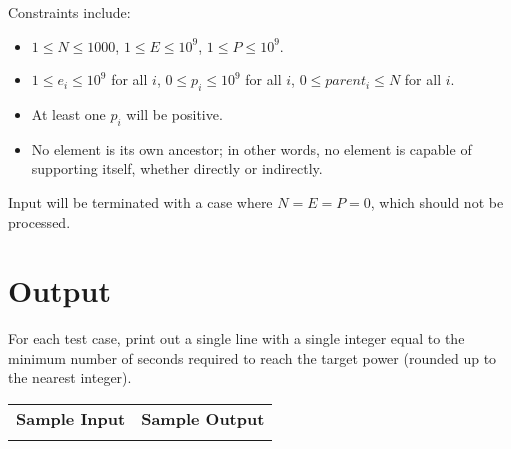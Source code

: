 \documentclass{article}
\begin{document}
Constraints include:
\begin{itemize}
\item $1 \le N \le 1000$, $1 \le E \le 10^9$, $1 \le P \le 10^9$.
\item $1 \le e_i \le 10^9$ for all $i$, $0 \le p_i \le 10^9$ for all $i$, $0
\le parent_i \le N$ for all $i$.
\item At least one $p_i$ will be positive.
\item No element is its own ancestor; in other words, no element is capable of supporting itself, whether directly or indirectly.
\end{itemize}

Input will be terminated with a case where $N = E = P = 0$, which should not be processed.

\newpage

\section{Output}

For each test case, print out a single line with a single integer equal to the minimum number of seconds required to reach the target power (rounded up to the nearest integer).

\vskip 16pt
\noindent
\setlength{\extrarowheight}{4pt}
\begin{tabularx}{\textwidth}{ | X | X | }
\hline
\textbf{Sample Input} & \textbf{Sample Output} \\

&

\\
\hline
\end{tabularx}
\end{document}
